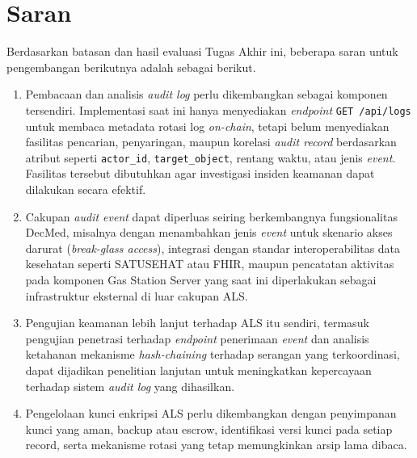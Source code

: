 \section{Saran}

Berdasarkan batasan dan hasil evaluasi Tugas Akhir ini, beberapa saran untuk pengembangan berikutnya adalah sebagai berikut.

\begin{enumerate}

    \item Pembacaan dan analisis \textit{audit log} perlu dikembangkan sebagai komponen tersendiri. Implementasi saat ini hanya menyediakan \textit{endpoint} \texttt{GET /api/logs} untuk membaca metadata rotasi log \textit{on-chain}, tetapi belum menyediakan fasilitas pencarian, penyaringan, maupun korelasi \textit{audit record} berdasarkan atribut seperti \texttt{actor\_id}, \texttt{target\_object}, rentang waktu, atau jenis \textit{event}. Fasilitas tersebut dibutuhkan agar investigasi insiden keamanan dapat dilakukan secara efektif.

    \item Cakupan \textit{audit event} dapat diperluas seiring berkembangnya fungsionalitas DecMed, misalnya dengan menambahkan jenis \textit{event} untuk skenario akses darurat (\textit{break-glass access}), integrasi dengan standar interoperabilitas data kesehatan seperti SATUSEHAT atau FHIR, maupun pencatatan aktivitas pada komponen Gas Station Server yang saat ini diperlakukan sebagai infrastruktur eksternal di luar cakupan ALS.

    \item Pengujian keamanan lebih lanjut terhadap ALS itu sendiri, termasuk pengujian penetrasi terhadap \textit{endpoint} penerimaan \textit{event} dan analisis ketahanan mekanisme \textit{hash-chaining} terhadap serangan yang terkoordinasi, dapat dijadikan penelitian lanjutan untuk meningkatkan kepercayaan terhadap sistem \textit{audit log} yang dihasilkan.

    \item Pengelolaan kunci enkripsi ALS perlu dikembangkan dengan penyimpanan kunci yang aman, backup atau escrow, identifikasi versi kunci pada setiap record, serta mekanisme rotasi yang tetap memungkinkan arsip lama dibaca.
\end{enumerate}